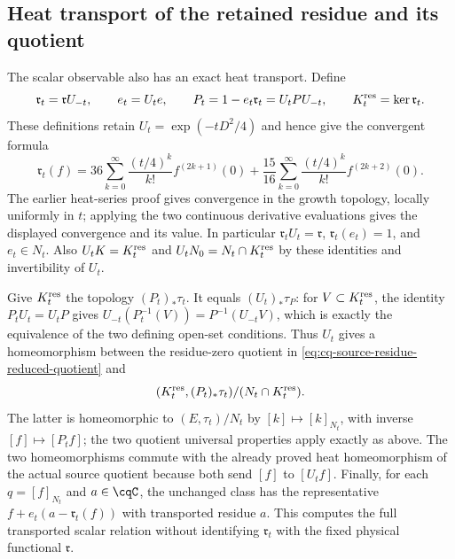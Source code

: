 \subsection{Heat transport of the retained residue and its quotient}
The scalar observable also has an exact heat transport. Define
\[
 \mathfrak r_t=\mathfrak r U_{-t},\qquad
 e_t=U_te,\qquad
 P_t=1-e_t\mathfrak r_t=U_tPU_{-t},\qquad
 K_t^{\rm res}=\ker\mathfrak r_t .
\]
These definitions retain $U_t=\exp(-tD^2/4)$ and hence
give the convergent formula
\begin{equation}
 \mathfrak r_t(f)
 =36\sum_{k=0}^{\infty}\frac{(t/4)^k}{k!}
       f^{(2k+1)}(0)
  +\frac{15}{16}\sum_{k=0}^{\infty}\frac{(t/4)^k}{k!}
       f^{(2k+2)}(0).
 \label{eq:cq-transported-spatial-residue}
\end{equation}
The earlier heat-series proof gives convergence in the growth
topology, locally uniformly in $t$; applying the two continuous
derivative evaluations gives the displayed convergence and
its value. In particular
$\mathfrak r_tU_t=\mathfrak r$,
$\mathfrak r_t(e_t)=1$, and $e_t\in N_t$.
Also $U_tK=K_t^{\rm res}$ and
$U_tN_0=N_t\cap K_t^{\rm res}$ by these identities and
invertibility of $U_t$.

Give $K_t^{\rm res}$ the topology $(P_t)_*\tau_t$.
It equals $(U_t)_*\tau_P$: for $V\subset K_t^{\rm res}$,
the identity $P_tU_t=U_tP$ gives
$U_{-t}(P_t^{-1}(V))=P^{-1}(U_{-t}V)$,
which is exactly the equivalence of the two defining open-set
conditions. Thus $U_t$ gives a homeomorphism between the
residue-zero quotient in
\eqref{eq:cq-source-residue-reduced-quotient} and
\[
 (K_t^{\rm res},(P_t)_*\tau_t)/
       (N_t\cap K_t^{\rm res}) .
\]
The latter is homeomorphic to $(E,\tau_t)/N_t$ by
$[k]\mapsto[k]_{N_t}$, with inverse $[f]\mapsto[P_tf]$;
the two quotient universal properties apply exactly as above.
The two homeomorphisms commute with the already proved heat
homeomorphism of the actual source quotient because both send
$[f]$ to $[U_tf]$. Finally, for each $q=[f]_{N_t}$ and
$a\in\cqC$, the unchanged class has the representative
$f+e_t(a-\mathfrak r_t(f))$ with transported residue $a$.
This computes the full transported scalar relation without
identifying $\mathfrak r_t$ with the fixed physical functional
$\mathfrak r$.
